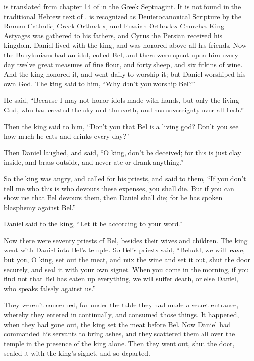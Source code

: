 {{{} is translated from chapter 14 of
{} in the Greek Septuagint. It is not found in the traditional Hebrew text of
{}.
{} is recognized as Deuterocanonical Scripture by the Roman Catholic, Greek Orthodox, and Russian Orthodox Churches.}King Astyages was gathered to his fathers, and Cyrus the Persian received his kingdom.
Daniel lived with the king, and was honored above all his friends.
Now the Babylonians had an idol, called Bel, and there were spent upon him every day twelve great measures of fine flour, and forty sheep, and six firkins of wine.
And the king honored it, and went daily to worship it; but Daniel worshiped his own God. The king said to him, “Why don’t you worship Bel?”
\par }{\PP {}He said, “Because I may not honor idols made with hands, but only the living God, who has created the sky and the earth, and has sovereignty over all flesh.”
\par }{\PP {}Then the king said to him, “Don’t you that Bel is a living god? Don’t you see how much he eats and drinks every day?”
\par }{\PP {}Then Daniel laughed, and said, “O king, don’t be deceived; for this is just clay inside, and brass outside, and never ate or drank anything.”
\par }{\PP {}So the king was angry, and called for his priests, and said to them, “If you don’t tell me who this is who devours these expenses, you shall die.
But if you can show me that Bel devours them, then Daniel shall die; for he has spoken blasphemy against Bel.”
\par }{\PP Daniel said to the king, “Let it be according to your word.”
\par }{\PP {}Now there were seventy priests of Bel, besides their wives and children. The king went with Daniel into Bel’s temple.
So Bel’s priests said, “Behold, we will leave; but you, O king, set out the meat, and mix the wine and set it out, shut the door securely, and seal it with your own signet.
When you come in the morning, if you find not that Bel has eaten up everything, we will suffer death, or else Daniel, who speaks falsely against us.”
\par }{\PP {}They weren’t concerned, for under the table they had made a secret entrance, whereby they entered in continually, and consumed those things.
It happened, when they had gone out, the king set the meat before Bel. Now Daniel had commanded his servants to bring ashes, and they scattered them all over the temple in the presence of the king alone. Then they went out, shut the door, sealed it with the king’s signet, and so departed.
}
